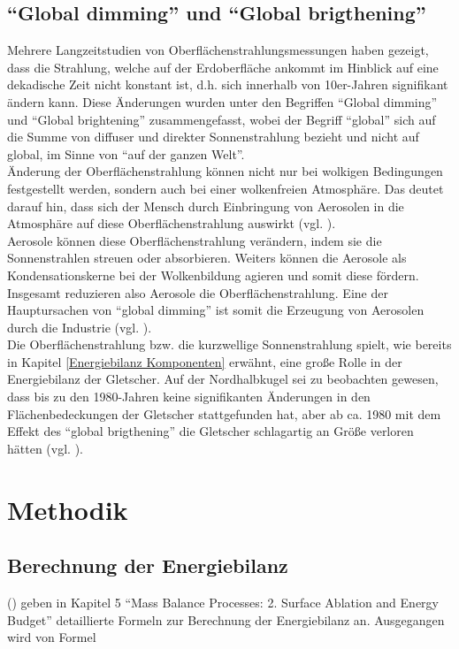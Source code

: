 \documentclass[12pt,a4paper]{article}
\begin{document}
\subsection{``Global dimming'' und ``Global brigthening''}
Mehrere Langzeitstudien von Oberflächenstrahlungsmessungen haben gezeigt, dass die Strahlung, welche auf der Erdoberfläche ankommt im Hinblick auf eine dekadische Zeit nicht konstant ist, d.h. sich innerhalb von 10er-Jahren signifikant ändern kann. Diese Änderungen wurden unter den Begriffen ``Global dimming'' und ``Global brightening'' zusammengefasst, wobei der Begriff ``global'' sich auf die Summe von diffuser und direkter Sonnenstrahlung bezieht und nicht auf global, im Sinne von ``auf der ganzen Welt''.\\
Änderung der Oberflächenstrahlung können nicht nur bei wolkigen Bedingungen festgestellt werden, sondern auch bei einer wolkenfreien Atmosphäre. Das deutet darauf hin, dass sich der Mensch durch Einbringung von Aerosolen in die Atmosphäre auf diese Oberflächenstrahlung auswirkt (vgl. \cite[1]{GlobalDimming}).\\
Aerosole können diese Oberflächenstrahlung verändern, indem sie die Sonnenstrahlen streuen oder absorbieren. Weiters können die Aerosole als Kondensationskerne bei der Wolkenbildung agieren und somit diese fördern. Insgesamt reduzieren also Aerosole die Oberflächenstrahlung. Eine der Hauptursachen von ``global dimming'' ist somit die Erzeugung von Aerosolen durch die Industrie (vgl. \cite[14]{GlobalDimming}).\\ 
Die Oberflächenstrahlung bzw. die kurzwellige Sonnenstrahlung spielt, wie bereits in Kapitel \ref{Energiebilanz Komponenten} erwähnt, eine große Rolle in der Energiebilanz der Gletscher. Auf der Nordhalbkugel sei zu beobachten gewesen, dass bis zu den 1980-Jahren keine signifikanten Änderungen in den Flächenbedeckungen der Gletscher stattgefunden hat, aber ab ca. 1980 mit dem Effekt des ``global brigthening'' die Gletscher schlagartig an Größe verloren hätten (vgl. \cite[24]{GlobalDimming}).


\pagebreak
\section{Methodik}
\subsection{Berechnung der Energiebilanz}
\citeauthor{ThePhysicsOfGlaciers} (\citeyear{ThePhysicsOfGlaciers}) geben in Kapitel 5 ``Mass Balance Processes: 2. Surface Ablation and Energy Budget'' detaillierte Formeln zur Berechnung der Energiebilanz an. Ausgegangen wird von Formel 
\end{document}
